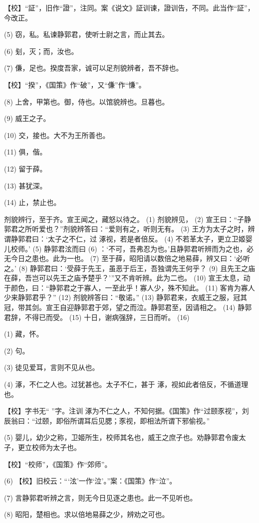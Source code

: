 \documentclass[12pt,UTF8]{ctexbook}
\begin{document}
【校】“証”，旧作“證”，注同。案《说文》証训谏，證训告，不同。此当作“証”，今改正。

(5) 窃，私。私谏静郭君，使听士尉之言，而止其去。

(6) 刬，灭；而，汝也。

(7) 傔，足也。揆度吾家，诚可以足剂貌辨者，吾不辞也。

【校】“揆”，《国策》作“破”，又“傔”作“慊”。

(8) 上舍，甲第也。御，侍也。以馆貌辨也。旦暮也。

(9) 威王之子。

(10) 交，接也。大不为王所善也。

(11) 俱，偕。

(12) 留于薛。

(13) 甚犹深。

(14) 止，禁止也。

剂貌辨行，至于齐。宣王闻之，藏怒以待之。 (1) 剂貌辨见， (2) 宣王曰：“子静郭君之所听爱也？”剂貌辨答曰：“爱则有之，听则无有。 (3) 王方为太子之时，辨谓静郭君曰：‘太子之不仁，过 涿视，若是者倍反。 (4) 不若革太子，更立卫姬婴儿校师。’ (5) 静郭君泫而曰 (6) ：‘不可，吾弗忍为也。’且静郭君听辨而为之也，必无今日之患也。此为一也。 (7) 至于薛，昭阳请以数倍之地易薛，辨又曰：‘必听之。’ (8) 静郭君曰：‘受薛于先王，虽恶于后王，吾独谓先王何乎？ (9) 且先王之庙在薛，吾岂可以先王之庙予楚乎？’”又不肯听辨。此为二也。 (10) 宣王太息，动于颜色，曰：“静郭君之于寡人，一至此乎！寡人少，殊不知此。 (11) 客肯为寡人少来静郭君乎？” (12) 剂貌辨答曰：“敬诺。” (13) 静郭君来，衣威王之服，冠其冠，带其剑。宣王自迎静郭君于郊，望之而泣。静郭君至，因请相之。 (14) 静郭君辞，不得已而受。 (15) 十日，谢病强辞，三日而听。 (16)

(1) 藏，怀。

(2) 句。

(3) 徒见爱耳，言则不见从也。

(4) 涿，不仁之人也。过犹甚也。太子不仁，甚于 涿，视如此者倍反，不循道理也。

【校】字书无“ ”字。注训 涿为不仁之人，不知何据。《国策》作“过颐豕视”，刘辰翁曰：“过颐，即俗所谓耳后见腮；豕视，即相法所谓下邪偷视。”

(5) 婴儿，幼少之称，卫姬所生，校师其名也，威王之庶子也。劝静郭君令废太子，更立校师为太子也。

【校】“校师”，《国策》作“郊师”。

(6) 【校】旧校云：“‘泫’一作‘泣’。”案：《国策》作“泣”。

(7) 言静郭君听辨之言，则无今日见逐之患也。此一不见听也。

(8) 昭阳，楚相也。求以倍地易薛之少，辨劝之可也。
\end{document}
